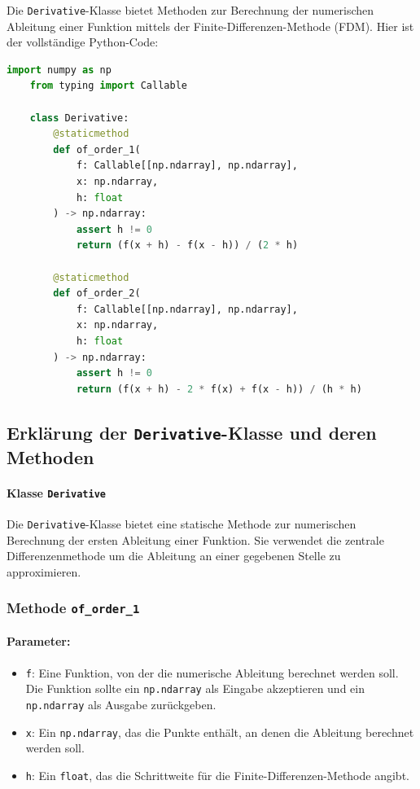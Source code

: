 Die  \texttt{Derivative}-Klasse bietet Methoden zur Berechnung der numerischen Ableitung einer Funktion mittels der Finite-Differenzen-Methode (FDM). Hier ist der vollständige Python-Code:

\begin{lstlisting}[language=Python, caption={Vollständiger Code der Derivative-Klasse}, label={lst:DerivativeClass}]
    import numpy as np
    from typing import Callable
    
    class Derivative:
        @staticmethod
        def of_order_1(
            f: Callable[[np.ndarray], np.ndarray],
            x: np.ndarray,
            h: float
        ) -> np.ndarray:
            assert h != 0
            return (f(x + h) - f(x - h)) / (2 * h)
    
        @staticmethod
        def of_order_2(
            f: Callable[[np.ndarray], np.ndarray],
            x: np.ndarray,
            h: float
        ) -> np.ndarray:
            assert h != 0
            return (f(x + h) - 2 * f(x) + f(x - h)) / (h * h)
\end{lstlisting}

\subsection{Erklärung der \texttt{Derivative}-Klasse und deren Methoden}

\paragraph{Klasse \texttt{Derivative}}

Die \texttt{Derivative}-Klasse bietet eine statische Methode zur numerischen Berechnung der ersten Ableitung einer Funktion. Sie verwendet die zentrale Differenzenmethode um die Ableitung an einer gegebenen Stelle zu approximieren.

\subsubsection{Methode \texttt{of\_order\_1}}

\paragraph{Parameter:}
\begin{itemize}
    \item \texttt{f}: Eine Funktion, von der die numerische Ableitung berechnet werden soll. Die Funktion sollte ein \texttt{np.ndarray} als Eingabe akzeptieren und ein \texttt{np.ndarray} als Ausgabe zurückgeben.
    \item \texttt{x}: Ein \texttt{np.ndarray}, das die Punkte enthält, an denen die Ableitung berechnet werden soll.
    \item \texttt{h}: Ein \texttt{float}, das die Schrittweite für die Finite-Differenzen-Methode angibt.
\end{itemize}


